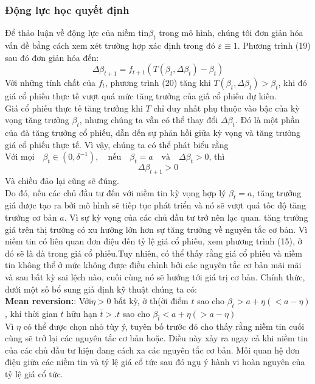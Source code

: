 \documentclass[10pt,a4paper]{article}
\begin{document}
	\subsubsection{Động lực học quyết định}
	Để thảo luận về động lực của niềm tin$\beta_t$ trong mô hình, chúng tôi đơn giản hóa vấn đề bằng cách xem xét trường hợp xác định trong đó $\varepsilon \equiv 1$. Phương trình (19) sau đó đơn giản hóa đến:
	\begin{equation}
	\Delta\beta_{t+1}=f_{t+1}(T(\beta_t,\Delta\beta_t)-\beta_t)
	\end{equation}
	Với những tính chất của $f_t$, phương trình (20) tăng khi $T(\beta_t,\Delta\beta_t)>\beta_t$, khi đó giá cổ phiếu thực tế vượt quá mức tăng trưởng của giấ cổ phiếu dự kiến.\\
	Giá cổ phiếu thực tế tăng trưởng khi $T$ chỉ duy nhất  phụ thuộc vào bậc của kỳ vọng tăng trưởng $\beta_t$, nhưng chúng ta vẫn có thể thay đổi $\Delta\beta_t$. Đó là một phần của đà tăng trưởng cổ phiếu, dẫn dến sự phản hồi giữa kỳ vọng và tăng trưởng giá cổ phiếu thực tế. Vì vậy, chúng ta có thể phát biểu rằng\\
	$\text{Với mọi} \quad\beta_t \in (0,\delta^{-1}),\quad \text{nếu}\quad \beta_t=a\quad\text{và}\quad \Delta\beta_t>0$, thì 
	$$\Delta\beta_{t+1}>0$$
	Và chiều đảo lại cũng sẽ đúng.\\
	
	Do đó, nếu các chủ đầu tư đến với niềm tin kỳ vọng hợp lý $\beta_t=a$,
	tăng trưởng giá được tạo ra bởi mô hình sẽ tiếp tục phát triển và nó sẽ vượt quá tốc độ tăng trưởng cơ bản $a$. Vì sự kỳ vọng của các chủ đầu tư trở nên lạc quan. tăng trưởng giá trên thị trường có xu hướng lớn hơn sự tăng trưởng về nguyên tắc cơ bản. 
	Vì niềm tin có liên quan đơn điệu đến tỷ lệ giá cổ phiếu, xem phương trình (15), ở đó
	sẽ là đà trong giá cổ phiếu.Tuy nhiên, có thể thấy rằng giá cổ phiếu và niềm tin không thể ở mức không được điều chỉnh bởi các nguyên tắc cơ bản mãi mãi và sau bất kỳ sai lệch nào, cuối cùng nó sẽ hướng tới giá trị cơ bản. Chính thức, dưới một số bổ sung
	giả định kỹ thuật chúng ta có:\\
	\textbf{Mean reversion:}: Với$\eta>0$  bất kỳ, ở th(ời điểm $t$ sao cho $\beta_t>a+\eta(< a-\eta)$, khi thời gian $t$ hữu hạn $\bar{t}>.t$ sao cho  $\beta_{\bar{t}}<a+\eta(>a-\eta)$\\
	
	Vì $\eta$ có thể được chọn nhỏ tùy ý, tuyên bố trước đó cho thấy rằng niềm tin cuối cùng sẽ trở lại các nguyên tắc cơ bản hoặc. Điều này xảy ra ngay cả khi niềm tin của các chủ đầu tư hiện đang cách xa các nguyên tắc cơ bản. Mối quan hệ đơn điệu giữa các niềm tin
	và tỷ lệ giá cổ tức sau đó ngụ ý hành vi hoàn nguyên của tỷ lệ giá cổ tức.
	
\end{document}
